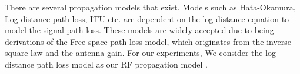 \documentclass[twocolumn, 11pt]{IEEEtran}
\begin{document}






There are several propagation models that exist. Models such as Hata-Okamura, Log distance path loss, ITU etc. are dependent on the log-distance equation to model the signal path loss. These models are widely accepted due to being derivations of the Free space path loss model, which originates from the inverse square law and the antenna gain. For our experiments, We consider the log distance path loss model as our RF propagation model \cite{sarkar2003survey, soorty2015finding}.
\end{document}
